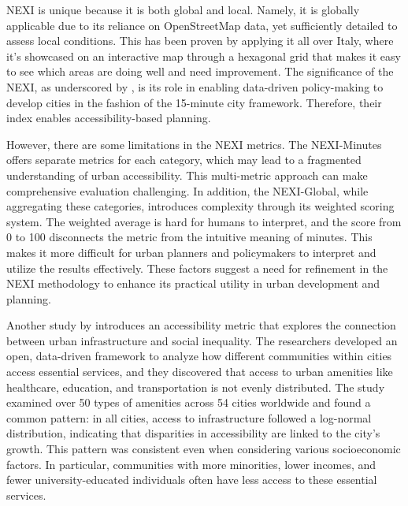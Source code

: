 NEXI is unique because it is both global and local. 
Namely, it is globally applicable due to its reliance on OpenStreetMap data, yet sufficiently detailed to assess local conditions.
This has been proven by applying it all over Italy, where it's showcased on an interactive map through a hexagonal grid that makes it easy to see which areas are doing well and need improvement.
The significance of the NEXI, as underscored by , is its role in enabling data-driven policy-making to develop cities in the fashion of the 15-minute city framework. 
Therefore, their index enables accessibility-based planning.

However, there are some limitations in the NEXI metrics. 
The NEXI-Minutes offers separate metrics for each category, which may lead to a fragmented understanding of urban accessibility. 
This multi-metric approach can make comprehensive evaluation challenging. 
In addition, the NEXI-Global, while aggregating these categories, introduces complexity through its weighted scoring system. 
The weighted average is hard for humans to interpret, and the score from 0 to 100 disconnects the metric from the intuitive meaning of minutes.
This makes it more difficult for urban planners and policymakers to interpret and utilize the results effectively. 
These factors suggest a need for refinement in the NEXI methodology to enhance its practical utility in urban development and planning.


Another study by  introduces an accessibility metric that explores the connection between urban infrastructure and social inequality. 
The researchers developed an open, data-driven framework to analyze how different communities within cities access essential services, and they discovered that access to urban amenities like healthcare, education, and transportation is not evenly distributed. 
The study examined over 50 types of amenities across 54 cities worldwide and found a common pattern: in all cities, access to infrastructure followed a log-normal distribution, indicating that disparities in accessibility are linked to the city's growth. 
This pattern was consistent even when considering various socioeconomic factors.
In particular, communities with more minorities, lower incomes, and fewer university-educated individuals often have less access to these essential services.

